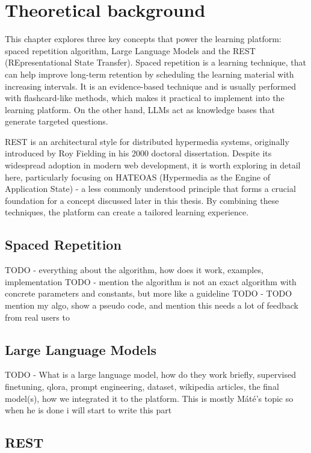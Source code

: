 \chapter{Theoretical background}

This chapter explores three key concepts that power the learning platform: spaced repetition algorithm, Large Language Models and the REST (REpresentational State Transfer). Spaced repetition is a learning technique, that can help improve long-term retention by scheduling the learning material with increasing intervals. It is an evidence-based technique and is usually performed with flashcard-like methods, which makes it practical to implement into the learning platform. On the other hand, LLMs act as knowledge bases that generate targeted questions.

REST is an architectural style for distributed hypermedia systems, originally introduced by Roy Fielding \cite{fielding2000} in his 2000 doctoral dissertation. Despite its widespread adoption in modern web development, it is worth exploring in detail here, particularly focusing on HATEOAS (Hypermedia as the Engine of Application State) - a less commonly understood principle that forms a crucial foundation for a concept discussed later in this thesis. By combining these techniques, the platform can create a tailored learning experience.

\section{Spaced Repetition}
TODO - everything about the algorithm, how does it work, examples, implementation
TODO - mention the algorithm is not an exact algorithm with concrete parameters and constants, but more like a guideline
TODO - TODO mention my algo, show a pseudo code, and mention this needs a lot of feedback from real users to 

\section{Large Language Models}
TODO - What is a large language model, how do they work briefly, supervised finetuning, qlora, prompt engineering, dataset, wikipedia articles, the final model(s), how we integrated it to the platform. This is mostly Máté's topic so when he is done i will start to write this part

\section{REST}

